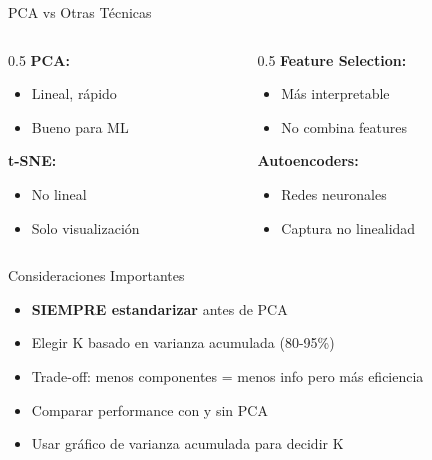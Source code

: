 \documentclass{beamer}
\begin{document}
\begin{frame}{PCA vs Otras Técnicas}
    \begin{columns}
        \begin{column}{0.5\textwidth}
            \textbf{PCA:}
            \begin{itemize}
                \item Lineal, rápido
                \item Bueno para ML
            \end{itemize}
            \vspace{1em}
            \textbf{t-SNE:}
            \begin{itemize}
                \item No lineal
                \item Solo visualización
            \end{itemize}
        \end{column}
        \begin{column}{0.5\textwidth}
            \textbf{Feature Selection:}
            \begin{itemize}
                \item Más interpretable
                \item No combina features
            \end{itemize}
            \vspace{1em}
            \textbf{Autoencoders:}
            \begin{itemize}
                \item Redes neuronales
                \item Captura no linealidad
            \end{itemize}
        \end{column}
    \end{columns}
\end{frame}

\begin{frame}{Consideraciones Importantes}
    \begin{itemize}
        \item \textbf{SIEMPRE estandarizar} antes de PCA
        \item Elegir K basado en varianza acumulada (80-95\%)
        \item Trade-off: menos componentes = menos info pero más eficiencia
        \item Comparar performance con y sin PCA
        \item Usar gráfico de varianza acumulada para decidir K
    \end{itemize}
\end{frame}
\end{document}
